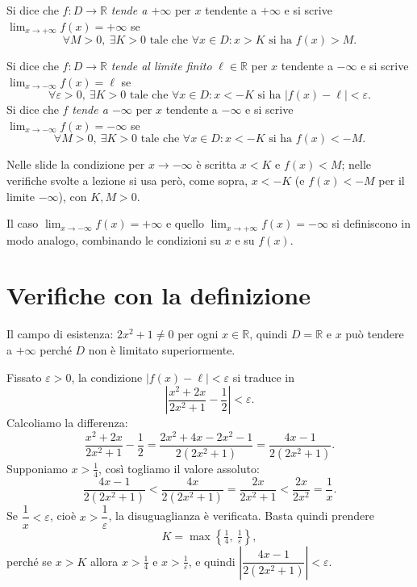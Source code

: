 \documentclass[11pt,a4paper]{article}
\begin{document}
\begin{definizione}
Si dice che $f : D \to \mathbb{R}$ \emph{tende a $+\infty$} per $x$ tendente a $+\infty$ e si scrive $\displaystyle\lim_{x \to +\infty} f(x) = +\infty$ se
\[
\forall M > 0,\ \exists K > 0 \text{ tale che } \forall x \in D : x > K \text{ si ha } f(x) > M .
\]
\end{definizione}

\begin{definizione}
Si dice che $f : D \to \mathbb{R}$ \emph{tende al limite finito} $\ell \in \mathbb{R}$ per $x$ tendente a $-\infty$ e si scrive $\displaystyle\lim_{x \to -\infty} f(x) = \ell$ se
\[
\forall \varepsilon > 0,\ \exists K > 0 \text{ tale che } \forall x \in D : x < -K \text{ si ha } |f(x) - \ell| < \varepsilon .
\]
Si dice che $f$ \emph{tende a $-\infty$} per $x$ tendente a $-\infty$ e si scrive $\displaystyle\lim_{x \to -\infty} f(x) = -\infty$ se
\[
\forall M > 0,\ \exists K > 0 \text{ tale che } \forall x \in D : x < -K \text{ si ha } f(x) < -M .
\]
\end{definizione}

\begin{osservazione}
Nelle slide la condizione per $x \to -\infty$ è scritta $x < K$ e $f(x) < M$; nelle verifiche svolte a lezione si usa però, come sopra, $x < -K$ (e $f(x) < -M$ per il limite $-\infty$), con $K, M > 0$.
\end{osservazione}

Il caso $\lim_{x\to-\infty} f(x) = +\infty$ e quello $\lim_{x\to+\infty} f(x) = -\infty$ si definiscono in modo analogo, combinando le condizioni su $x$ e su $f(x)$.

\section{Verifiche con la definizione}

\begin{esempio}[$\lim_{x\to+\infty}\frac{x^2+2x}{2x^2+1} = \frac{1}{2}$]
Il campo di esistenza: $2x^2 + 1 \neq 0$ per ogni $x \in \mathbb{R}$, quindi $D = \mathbb{R}$ e $x$ può tendere a $+\infty$ perché $D$ non è limitato superiormente.

Fissato $\varepsilon > 0$, la condizione $|f(x) - \ell| < \varepsilon$ si traduce in
\[
\left| \frac{x^2 + 2x}{2x^2 + 1} - \frac{1}{2} \right| < \varepsilon .
\]
Calcoliamo la differenza:
\[
\frac{x^2 + 2x}{2x^2 + 1} - \frac{1}{2} = \frac{2x^2 + 4x - 2x^2 - 1}{2(2x^2 + 1)} = \frac{4x - 1}{2(2x^2 + 1)} .
\]
Supponiamo $x > \tfrac{1}{4}$, così togliamo il valore assoluto:
\[
\frac{4x - 1}{2(2x^2 + 1)} < \frac{4x}{2(2x^2 + 1)} = \frac{2x}{2x^2 + 1} < \frac{2x}{2x^2} = \frac{1}{x} .
\]
Se $\dfrac{1}{x} < \varepsilon$, cioè $x > \dfrac{1}{\varepsilon}$, la disuguaglianza è verificata. Basta quindi prendere
\[
K = \max\left\{ \tfrac{1}{4},\ \tfrac{1}{\varepsilon} \right\},
\]
perché se $x > K$ allora $x > \tfrac{1}{4}$ e $x > \tfrac{1}{\varepsilon}$, e quindi $\left|\dfrac{4x-1}{2(2x^2+1)}\right| < \varepsilon$.
\end{esempio}
\end{document}

